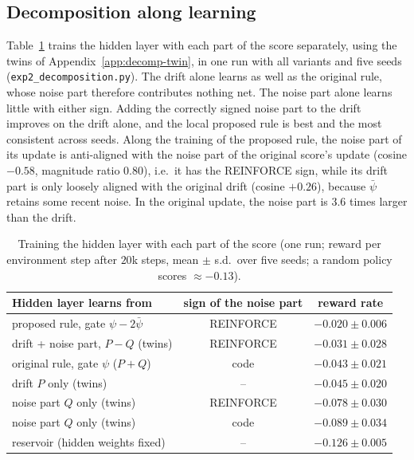 \documentclass[10pt,twocolumn]{article}
\begin{document}
\subsection{Decomposition along learning}
\label{app:gridtoy-decomp}
Table~\ref{tab:toy-decomp} trains the hidden layer with each part of the score
separately, using the twins of Appendix~\ref{app:decomp-twin}, in one run with all
variants and five seeds (\texttt{exp2\_decomposition.py}). The drift alone learns as
well as the original rule, whose noise part therefore contributes nothing net. The
noise part alone learns little with either sign. Adding the correctly signed noise
part to the drift improves on the drift alone, and the local proposed rule is best
and the most consistent across seeds. Along the training of the proposed rule, the
noise part of its update is anti-aligned with the noise part of the original
score's update (cosine $-0.58$, magnitude ratio $0.80$), i.e.\ it has the REINFORCE
sign, while its drift part is only loosely aligned with the original drift (cosine
$+0.26$), because $\bar\psi$ retains some recent noise. In the original update, the
noise part is $3.6$ times larger than the drift.

\begin{table}[h]
\centering\small
\caption{Training the hidden layer with each part of the score (one run; reward
per environment step after $20$k steps, mean $\pm$ s.d.\ over five seeds; a random
policy scores $\approx-0.13$).}
\label{tab:toy-decomp}
\begin{tabular}{lcc}
\toprule
Hidden layer learns from & sign of the noise part & reward rate\\
\midrule
proposed rule, gate $\psi-2\bar\psi$ & REINFORCE & $-0.020\pm0.006$\\
drift + noise part, $P-Q$ (twins) & REINFORCE & $-0.031\pm0.028$\\
original rule, gate $\psi$ ($P+Q$) & code & $-0.043\pm0.021$\\
drift $P$ only (twins) & -- & $-0.045\pm0.020$\\
noise part $Q$ only (twins) & REINFORCE & $-0.078\pm0.030$\\
noise part $Q$ only (twins) & code & $-0.089\pm0.034$\\
reservoir (hidden weights fixed) & -- & $-0.126\pm0.005$\\
\bottomrule
\end{tabular}
\end{table}
\end{document}
